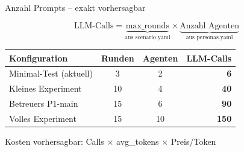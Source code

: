 \documentclass[aspectratio=169, 12pt]{beamer}
\begin{document}
\begin{frame}{Anzahl Prompts -- exakt vorhersagbar}

\begin{center}
\Large
$$\text{LLM-Calls} = \underbrace{\text{max\_rounds}}_{\text{aus scenario.yaml}} \times \underbrace{\text{Anzahl Agenten}}_{\text{aus personas.yaml}}$$
\end{center}

\vspace{0.4cm}

\begin{table}[h]
\centering
\begin{tabular}{lccr}
\toprule
\textbf{Konfiguration} & \textbf{Runden} & \textbf{Agenten} & \textbf{LLM-Calls} \\
\midrule
Minimal-Test (aktuell) & 3 & 2 & \textbf{6} \\
Kleines Experiment     & 10 & 4 & \textbf{40} \\
Betreuers P1-main      & 15 & 6 & \textbf{90} \\
Volles Experiment      & 15 & 10 & \textbf{150} \\
\bottomrule
\end{tabular}
\end{table}

\vspace{0.3cm}
\begin{center}
\small Kosten vorhersagbar: Calls $\times$ avg\_tokens $\times$ Preis/Token
\end{center}

\end{frame}
\end{document}
